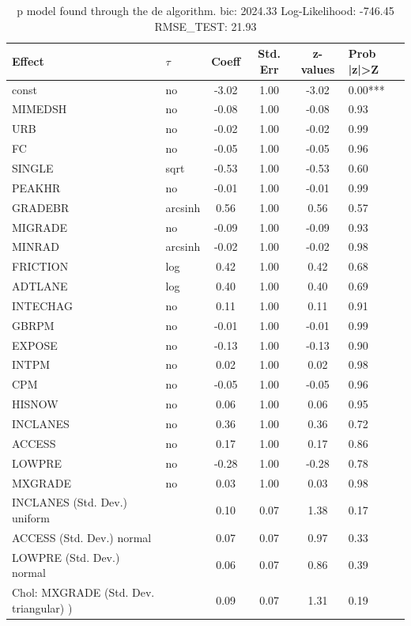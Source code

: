 \begin{table}
	\caption{p model found through the de algorithm. bic: 2024.33 Log-Likelihood: -746.45 RMSE_TEST: 21.93}
	\begin{center}
		\begin{tabular}{|l|l|c|c|c|l|}
			\hline
			Effect & $\tau$ & Coeff & Std. Err & z-values & Prob |z|>Z \\
			\hline
			const & no & -3.02 & 1.00 & -3.02 & 0.00*** \\
			\hline
			MIMEDSH & no & -0.08 & 1.00 & -0.08 & 0.93 \\
			\hline
			URB & no & -0.02 & 1.00 & -0.02 & 0.99 \\
			\hline
			FC & no & -0.05 & 1.00 & -0.05 & 0.96 \\
			\hline
			SINGLE & sqrt & -0.53 & 1.00 & -0.53 & 0.60 \\
			\hline
			PEAKHR & no & -0.01 & 1.00 & -0.01 & 0.99 \\
			\hline
			GRADEBR & arcsinh & 0.56 & 1.00 & 0.56 & 0.57 \\
			\hline
			MIGRADE & no & -0.09 & 1.00 & -0.09 & 0.93 \\
			\hline
			MINRAD & arcsinh & -0.02 & 1.00 & -0.02 & 0.98 \\
			\hline
			FRICTION & log & 0.42 & 1.00 & 0.42 & 0.68 \\
			\hline
			ADTLANE & log & 0.40 & 1.00 & 0.40 & 0.69 \\
			\hline
			INTECHAG & no & 0.11 & 1.00 & 0.11 & 0.91 \\
			\hline
			GBRPM & no & -0.01 & 1.00 & -0.01 & 0.99 \\
			\hline
			EXPOSE & no & -0.13 & 1.00 & -0.13 & 0.90 \\
			\hline
			INTPM & no & 0.02 & 1.00 & 0.02 & 0.98 \\
			\hline
			CPM & no & -0.05 & 1.00 & -0.05 & 0.96 \\
			\hline
			HISNOW & no & 0.06 & 1.00 & 0.06 & 0.95 \\
			\hline
			INCLANES & no & 0.36 & 1.00 & 0.36 & 0.72 \\
			\hline
			ACCESS & no & 0.17 & 1.00 & 0.17 & 0.86 \\
			\hline
			LOWPRE & no & -0.28 & 1.00 & -0.28 & 0.78 \\
			\hline
			MXGRADE & no & 0.03 & 1.00 & 0.03 & 0.98 \\
			\hline
			INCLANES (Std. Dev.) uniform &  & 0.10 & 0.07 & 1.38 & 0.17 \\
			\hline
			ACCESS (Std. Dev.) normal &  & 0.07 & 0.07 & 0.97 & 0.33 \\
			\hline
			LOWPRE (Std. Dev.) normal &  & 0.06 & 0.07 & 0.86 & 0.39 \\
			\hline
			 Chol: MXGRADE (Std. Dev. triangular) ) &  & 0.09 & 0.07 & 1.31 & 0.19 \\
			\hline
		\end{tabular}
	\end{center}
\end{table}